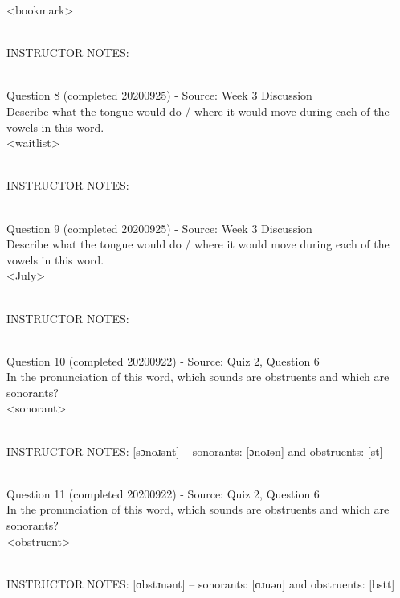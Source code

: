 \documentclass[12pt]{article}
\begin{document}
<bookmark>


~\\
INSTRUCTOR NOTES: 


~\\

{\large Question 8} (completed 20200925) - Source: Week 3 Discussion\\

Describe what the tongue would do / where it would move during each of the vowels in this word.\\

<waitlist>


~\\
INSTRUCTOR NOTES: 


~\\

{\large Question 9} (completed 20200925) - Source: Week 3 Discussion\\

Describe what the tongue would do / where it would move during each of the vowels in this word.\\

<July>


~\\
INSTRUCTOR NOTES: 


~\\

{\large Question 10} (completed 20200922) - Source: Quiz 2, Question 6\\

In the pronunciation of this word, which sounds are obstruents and which are sonorants?\\

<sonorant>


~\\
INSTRUCTOR NOTES: [sɔnoɹənt] -- sonorants: [ɔnoɹən] and obstruents: [st]


~\\

{\large Question 11} (completed 20200922) - Source: Quiz 2, Question 6\\

In the pronunciation of this word, which sounds are obstruents and which are sonorants?\\

<obstruent>


~\\
INSTRUCTOR NOTES: [ɑbstɹuənt] -- sonorants: [ɑɹuən] and obstruents: [bstt]


~\\
\end{document}
